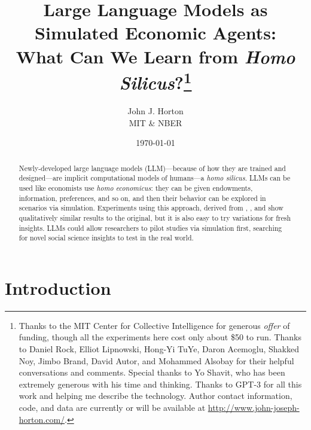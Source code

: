 \documentclass[11pt]{article}
\begin{document}
  

\date{\today}

\newcommand{\WorkingTitle}{Large Language Models as Simulated Economic Agents:\\ What Can We Learn from \emph{Homo Silicus}?}
  \title{\WorkingTitle{}\thanks{
      Thanks to the MIT Center for Collective Intelligence for generous \emph{offer} of funding, though all the experiments here cost only about \$50 to run.
      Thanks to Daniel Rock, Elliot Lipnowski, Hong-Yi TuYe, Daron Acemoglu, Shakked Noy, Jimbo Brand, David Autor, and Mohammed Alsobay for their helpful conversations and comments.
      Special thanks to Yo Shavit, who has been extremely generous with his time and thinking.
      Thanks to GPT-3 for all this work and helping me describe the technology.
Author contact information, code, and data are currently or will be available at \url{http://www.john-joseph-horton.com/}.
}} 
\author{John J. Horton   \\ MIT \& NBER}

\maketitle

\begin{abstract}
\noindent Newly-developed large language models (LLM)---because of how they are trained and designed---are implicit computational models of humans---a \emph{homo silicus}.
LLMs can be used like economists use \emph{homo economicus}: they can be given endowments, information, preferences, and so on, and then their behavior can be explored in scenarios via simulation.
Experiments using this approach, derived from \cite{charness2002understanding}, \cite{kahneman1986fairness}, and \cite{samuelson1988status} show qualitatively similar results to the original, but it is also easy to try variations for fresh insights.
LLMs could allow researchers to pilot studies via simulation first, searching for novel social science insights to test in the real world.
\newline \newline
\end{abstract} 

\onehalfspacing
\newpage \clearpage

\section{Introduction}
\end{document}
